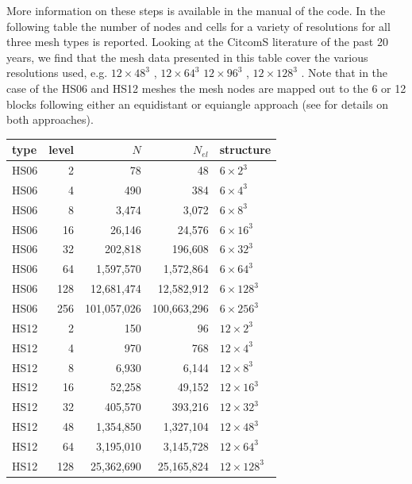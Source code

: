 More information on these steps is available in the manual of the code.
In the following table the number of nodes and cells for a variety of resolutions 
for all three mesh types is reported. Looking at the CitcomS literature of the past 20 years, we find that 
the mesh data presented in this table cover the various resolutions used, e.g.
$12\times48^3$ \cite{mczh04,arfw14}, $12\times64^3$ \cite{budt14}
$12\times96^3$ \cite{bumb10}, $12\times128^3$ \cite{beck06,wele16,welm16}.
Note that in the case of the HS06 and HS12 meshes the mesh nodes are mapped out to the 6 or 12 blocks 
following either an equidistant or equiangle approach (see \cite{puli07}
for details on both approaches). 

\begin{center}
\begin{tabular}{lrrrl}
\hline
type & level & $N$ & $N_{el}$ & structure\\
\hline
\hline
HS06 & 
2   &  78        &  48         &$6\times 2^3$    \\
HS06 & 
4   &  490       &  384        &$6\times 4^3$    \\
HS06 & 
8   &  3,474      &  3,072       &$6\times 8^3$    \\
HS06 & 
16  &  26,146     &  24,576      &$6\times 16^3$    \\
HS06 & 
32  &  202,818    &  196,608     &$6\times 32^3$    \\
HS06 & 
64  &  1,597,570   &  1,572,864    &$6\times 64^3$    \\
HS06 & 
128 &  12,681,474  &  12,582,912   &$6\times 128^3$    \\
HS06 & 
256 &  101,057,026 &  100,663,296  &$6\times 256^3$    \\
\hline
HS12 & 2    &          150  &          96  &  $12\times 2^3$ \\
HS12 & 4    &          970  &         768  &  $12\times 4^3$ \\
HS12 & 8    &        6,930  &       6,144  &  $12\times 8^3$ \\
HS12 & 16   &       52,258  &      49,152  &  $12\times 16^3$ \\
HS12 & 32   &      405,570  &     393,216  &  $12\times 32^3$ \\
HS12 & 48   &    1,354,850  &   1,327,104  &  $12\times 48^3$ \\
HS12 & 64   &    3,195,010  &   3,145,728  &  $12\times 64^3$ \\
HS12 & 128  &   25,362,690  &  25,165,824  &  $12\times 128^3$ \\

\end{tabular}
\end{center}
